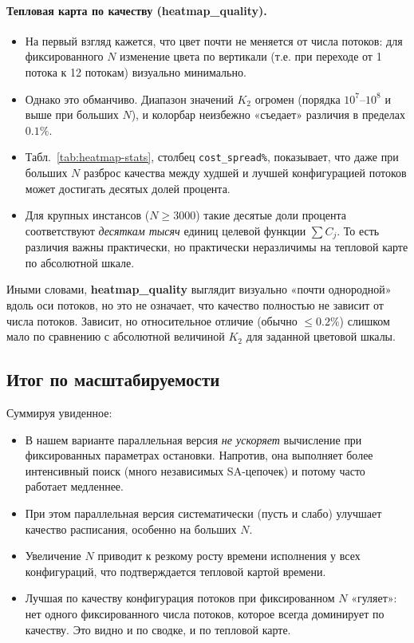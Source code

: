 \documentclass[a4paper,12pt]{article}
\begin{document}
\paragraph{Тепловая карта по качеству (heatmap\_quality).}
\begin{itemize}
    \item На первый взгляд кажется, что цвет почти не меняется от числа потоков: для фиксированного $N$ изменение цвета по вертикали (т.е. при переходе от 1 потока к 12 потокам) визуально минимально.
    \item Однако это обманчиво. Диапазон значений $K_2$ огромен (порядка $10^7$--$10^8$ и выше при больших $N$), и колорбар неизбежно «съедает» различия в пределах $0.1\%$.
    \item Табл.~\ref{tab:heatmap-stats}, столбец \texttt{cost\_spread\%}, показывает, что даже при больших $N$ разброс качества между худшей и лучшей конфигурацией потоков может достигать десятых долей процента.
    \item Для крупных инстансов ($N \ge 3000$) такие десятые доли процента соответствуют \emph{десяткам тысяч} единиц целевой функции $\sum C_j$. То есть различия важны практически, но практически неразличимы на тепловой карте по абсолютной шкале.
\end{itemize}

Иными словами, \textbf{heatmap\_quality} выглядит визуально «почти однородной» вдоль оси потоков, но это не означает, что качество полностью не зависит от числа потоков. Зависит, но относительное отличие (обычно $\leq 0.2\%$) слишком мало по сравнению с абсолютной величиной $K_2$ для заданной цветовой шкалы.

\subsection{Итог по масштабируемости}

Суммируя увиденное:
\begin{itemize}
    \item В нашем варианте параллельная версия \emph{не ускоряет} вычисление при фиксированных параметрах остановки. Напротив, она выполняет более интенсивный поиск (много независимых SA-цепочек) и потому часто работает медленнее.
    \item При этом параллельная версия систематически (пусть и слабо) улучшает качество расписания, особенно на больших $N$. 
    \item Увеличение $N$ приводит к резкому росту времени исполнения у всех конфигураций, что подтверждается тепловой картой времени.
    \item Лучшая по качеству конфигурация потоков при фиксированном $N$ «гуляет»: нет одного фиксированного числа потоков, которое всегда доминирует по качеству. Это видно и по сводке, и по тепловой карте.
\end{itemize}
\end{document}
